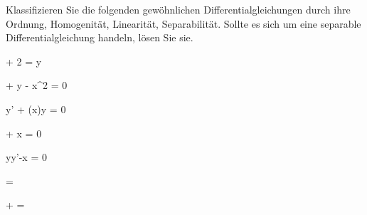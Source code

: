 \begin{atiTask}[
	title = Klassifikation von gewöhnlichen Differentialgleichungen,
	language = Deutsch,
]
	Klassifizieren Sie die folgenden gewöhnlichen Differentialgleichungen durch ihre Ordnung, Homogenität, Linearität, Separabilität.
	Sollte es sich um eine separable Differentialgleichung handeln, lösen Sie sie.
	\begin{atiSubequations}
		\begin{minipage}{0.5\textwidth}
		\item{
			 + 2 = y
		}
		\item{
			 + \sin y - x^2 = 0
		}
		\item{
			y' + \tan(x)\cdot y = 0
		}
		\end{minipage}
		\begin{minipage}{0.5\textwidth}
		\item{
			 + x = 0
		}
		\item{
			yy'-x = 0
		}
		\item{
			 = 
		}
		\end{minipage}
		\item{
			 +  = 
		}
	\end{atiSubequations}
\end{atiTask}